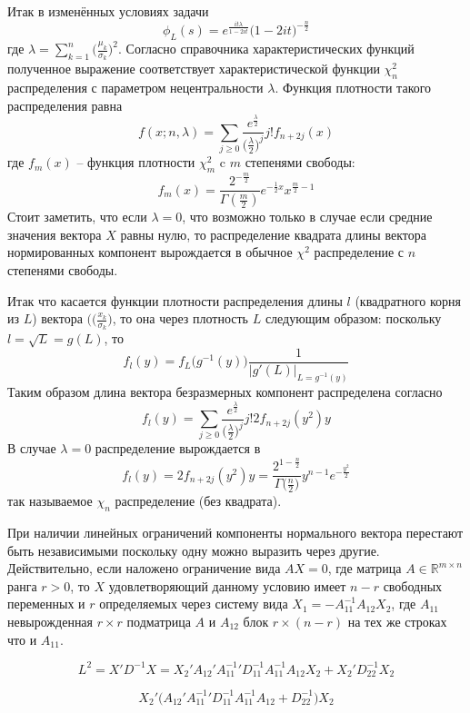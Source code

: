 \documentclass[a4paper]{article}
\newcommand{\Real}{\mathbb{R}}
\begin{document}
Итак в изменённых условиях задачи 
\[\phi_L(s) = e^\frac{it \lambda}{1 - 2it} \bigl(1 - 2it\bigr)^{-\frac{n}{2}}\]
где $\lambda = \sum_{k=1}^n \bigl(\frac{\mu_k}{\sigma_k}\bigr)^2$. Согласно справочника
характеристических функций полученное выражение соответствует характеристической
функции $\chi^2_n$ распределения с параметром нецентральности $\lambda$. Функция
плотности такого распределения равна
\[
f(x;n,\lambda)
= \sum_{j\geq 0} \frac{e^\frac{\lambda}{2}}{ \bigl(\frac{\lambda}{2}\bigr)^j}{j!} f_{n+2j}(x)
\]
где $f_m(x)$ -- функция плотности $\chi^2_m$ c $m$ степенями свободы:
\[f_m(x) = \frac{2^{-\frac{m}{2}}}{\Gamma(\frac{m}{2})} e^{-\frac{1}{2}x} x^{\frac{m}{2}-1}\]
Стоит заметить, что если $\lambda = 0$, что возможно только в случае если средние
значения вектора $X$ равны нулю, то распределение квадрата длины вектора
нормированных компонент вырождается в обычное $\chi^2$ распределение с $n$ степенями
свободы.

Итак что касается функции плотности распределения длины $l$ (квадратного корня из $L$)
вектора $(\bigl(\frac{x_k}{\sigma_k}\bigr)$, то она через плотность $L$ следующим
образом: поскольку $l = \sqrt{L} = g(L)$, то
\[f_l(y) = f_L\bigl(g^{-1}(y)\bigr) \frac{1}{\bigl\lvert g'(L)\bigr\rvert_{L=g^{-1}(y)}}\]
Таким образом длина вектора безразмерных компонент распределена согласно
\[f_l(y) = \sum_{j\geq 0} \frac{e^\frac{\lambda}{2}}{ \bigl(\frac{\lambda}{2}\bigr)^j}{j!} 2 f_{n+2j}(y^2) y\]
В случае $\lambda = 0$ распределение вырождается в 
\[
f_l(y)
= 2 f_{n+2j}(y^2) y
= \frac{2^{1-\frac{n}{2}}}{\Gamma\bigl(\frac{n}{2}\bigr)} y^{n-1} e^{-\frac{y^2}{2}}
\]
так называемое $\chi_n$ распределение (без квадрата).

При наличии линейных ограничений компоненты нормального вектора перестают быть
независимыми поскольку одну можно выразить через другие. Действительно, если наложено
ограничение вида $AX = 0$, где матрица $A\in \Real^{m\times n}$ ранга $r>0$, то
$X$ удовлетворяющий данному условию имеет $n-r$ свободных переменных и $r$
определяемых через систему вида $X_1 = -A_{11}^{-1} A_{12} X_2$, где $A_{11}$
невырожденная $r\times r$ подматрица $A$ и $A_{12}$ блок $r\times (n-r)$ на тех же
строках что и $A_{11}$.

\[
L^2 = X'D^{-1}X
= X_2'A_{12}'A_{11}^{-1}'D_{11}^{-1}A_{11}^{-1} A_{12} X_2 + X_2'D_{22}^{-1}X_2
\]

\[
X_2'\bigl(
A_{12}'A_{11}^{-1}'D_{11}^{-1}A_{11}^{-1} A_{12} + D_{22}^{-1}
\bigr)X_2

\]

\end{document}
